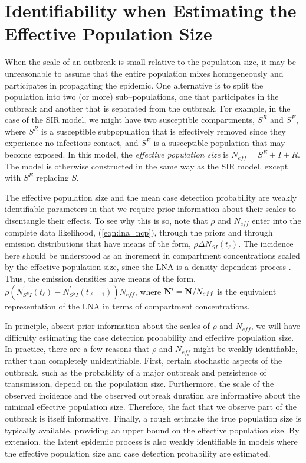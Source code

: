 \newpage
\section{Identifiability when Estimating the Effective Population Size}
\label{sec:effpop_identifiability}
When the scale of an outbreak is small relative to the population size, it may be unreasonable to assume that the entire population mixes homogeneously and participates in propagating the epidemic. One alternative is to split the population into two (or more) sub--populations, one that participates in the outbreak and another that is separated from the outbreak. For example, in the case of the SIR model, we might have two susceptible compartments, $ S^R $ and $ S^E $, where $ S^R $ is a susceptible subpopulation that is effectively removed since they experience no infectious contact, and $ S^E $ is a susceptible population that may become exposed. In this model, the \textit{effective population size} is $ N_{eff} = S^E + I + R $. The model is otherwise constructed in the same way as the SIR model, except with $ S^E $ replacing $ S $. 

The effective population size and the mean case detection probability are weakly identifiable parameters in that we require prior information about their scales to disentangle their effects. To see why this is so, note that $ \rho $ and $ N_{eff} $ enter into the complete data likelihood, (\ref{eqn:lna_ncp}), through the priors and through emission distributions that have means of the form, $ \rho\Delta N_{SI}(t_\ell) $. The incidence here should be understood as an increment in compartment concentrations scaled by the effective population size, since the LNA is a density dependent process \cite{komorowski2009,wilkinson2011stochastic,fearnhead2014}. Thus, the emission densities have means of the form, $ \rho\left (N^\prime_{S^SI}(t_{\ell}) - N^\prime_{S^SI}(t_{\ell-1})\right )N_{eff} $, where $ \mathbf{N}^\prime = \mathbf{N}/N_{eff} $ is the equivalent representation of the LNA in terms of compartment concentrations. 

In principle, absent prior information about the scales of $ \rho $ and $ N_{eff} $, we will have difficulty estimating the case detection probability and effective population size. In practice, there are a few reasons that $ \rho $ and $ N_{eff} $ might be weakly identifiable, rather than completely unidentifiable. First, certain stochastic aspects of the outbreak, such as the probability of a major outbreak and persistence of transmission, depend on the population size. Furthermore, the scale of the observed incidence and the observed outbreak duration are informative about the minimal effective population size. Therefore, the fact that we observe part of the outbreak is itself informative. Finally, a rough estimate the true population size is typically available, providing an upper bound on the effective population size. By extension, the latent epidemic process is also weakly identifiable in models where the effective population size and case detection probability are estimated.

